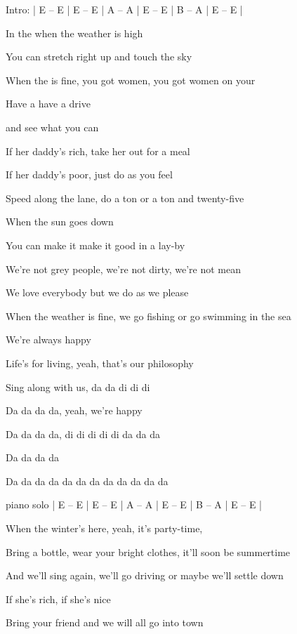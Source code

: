 

\ifdefined\TPBAND

	Intro:  
	| E – E | E – E | A – A | E – E | B – A | E – E | 
\fi

\zs
In the  when the weather is high
                              
You can stretch right up and touch the sky

When the  is fine, you got women, you got women on your 

Have a  have a drive

 and see what you can 
\ks

\zs
If her daddy's rich, take her out for a meal
                           
If her daddy's poor, just do as you feel

Speed along the lane, do a ton or a ton and twenty-five
         
When the sun goes down

You can make it make it good in a lay-by
\ks

\zs
We're not grey people, we're not dirty, we're not mean
                             
We love everybody but we do as we please

When the weather is fine, we go fishing or go swimming in the sea

We're always happy

Life's for living, yeah, that's our philosophy
\ks

\zs
Sing along with us, da da di di di 
                       
Da da da da, yeah, we're happy 

Da da da da, di di di di di da da da 

Da da da da

Da da da da da da da da da da da da 
\ks

\ifdefined\TPBAND
	piano solo 
	| E – E | E – E | A – A | E – E | B – A | E – E | 
\fi

\zs
When the winter's here, yeah, it's party-time,
                                                       
Bring a bottle, wear your bright clothes, it'll soon be summertime

And we'll sing again, we'll go driving or maybe we'll settle down
                
If she's rich, if she's nice

Bring your friend and we will all go into town
\ks

\kp
